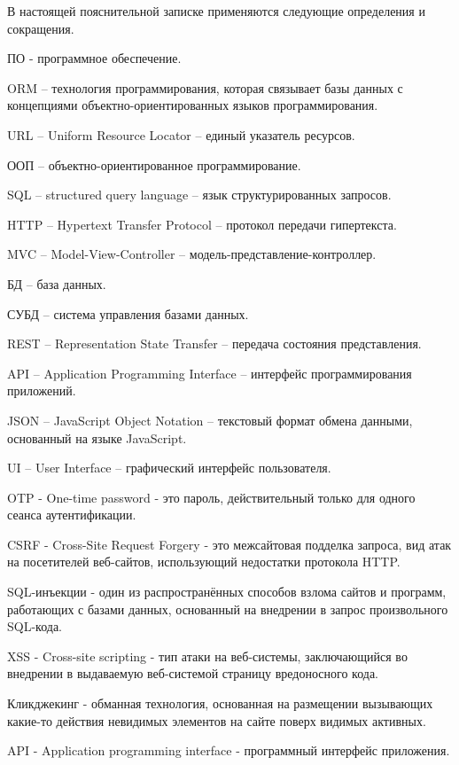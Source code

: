 \thispagestyle{empty}

В настоящей пояснительной записке применяются следующие определения и сокращения.

ПО - программное обеспечение.

ORM – технология программирования, которая связывает базы данных с концепциями объектно-ориентированных языков программирования.

URL – Uniform Resource Locator – единый указатель ресурсов.

ООП – объектно-ориентированное программирование.

SQL – structured query language – язык структурированных запросов.

HTTP – Hypertext Transfer Protocol – протокол передачи гипертекста.

MVC – Model-View-Controller – модель-представление-контроллер.

БД – база данных.

СУБД – система управления базами данных.

REST – Representation State Transfer – передача состояния представления.

API – Application Programming Interface – интерфейс программирования приложений.

JSON – JavaScript Object Notation – текстовый формат обмена данными, основанный на языке JavaScript.

UI – User Interface – графический интерфейс пользователя.

OTP - One-time password - это пароль, действительный только для одного сеанса аутентификации.

CSRF - Cross-Site Request Forgery - это межсайтовая подделка запроса, вид атак на посетителей веб-сайтов, использующий недостатки протокола HTTP.

SQL-инъекции - один из распространённых способов взлома сайтов и программ, работающих с базами данных, основанный на внедрении в запрос произвольного SQL-кода.

XSS - Cross-site scripting - тип атаки на веб-системы, заключающийся во внедрении в выдаваемую веб-системой страницу вредоносного кода.

Кликджекинг - обманная технология, основанная на размещении вызывающих какие-то действия невидимых элементов на сайте поверх видимых активных.

API - Application programming interface - программный интерфейс приложения.

